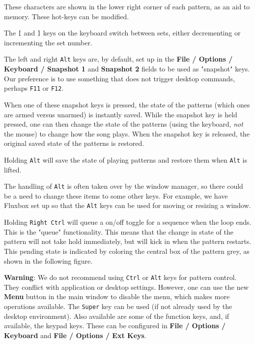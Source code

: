    These characters are shown in the lower right corner of each
   pattern, as an aid to memory.
   These hot-keys can be modified.

   \index{keys![}
   The \texttt{[} and
   \index{keys!]}
   \texttt{]} keys on the keyboard
   switch between sets, either decrementing or incrementing the set number.

   The left and right \texttt{Alt} keys are, by default, set up in the
   \textbf{File / Options / Keyboard / Snapshot 1} and
   \textbf{Snapshot 2} fields to be used as "snapshot" keys.
   Our preference is to use something that does not trigger desktop
   commands, perhaps \texttt{F11} or \texttt{F12}.

   When one of these snapshot keys is pressed, the state of the patterns
   (which ones are armed versus unarmed) is instantly saved.  While the
   snapshot key is held pressed, one can then change the state of the patterns
   (using the keyboard, \textsl{not} the mouse)
   to change how the song plays.  When the snapshot key is released, the
   original saved state of the patterns is restored.

   Holding \texttt{Alt} will save the state of playing patterns and restore
   them when \texttt{Alt} is lifted.

   The handling of \texttt{Alt} is often taken over by the window
   manager, so there could be a need to change these items to some other
   keys.  For example, we have Fluxbox set up so that the \texttt{Alt} keys can
   be used for moving or resizing a window.


   Holding \texttt{Right Ctrl}
   will queue a on/off toggle for a 
   sequence when the loop ends. This is the "queue" functionality.
   This means that the change in state of the pattern will not take hold
   immediately, but will kick in when the pattern restarts.
   This pending state is indicated by coloring the central box of the
   pattern grey, as shown in the following figure.

   \textbf{Warning}:  We do not recommend using \texttt{Ctrl} or \texttt{Alt}
   keys for pattern control.  They conflict with application or desktop
   settings.  However, one can use the new \textbf{Menu} button in the main
   window to disable the menu, which makes more operations available.
   The \texttt{Super} key can be used (if not already used by the desktop
   environment).  Also available are some of the function keys, and, if
   available, the keypad keys.  These can be configured in
   \textbf{File / Options / Keyboard} and
   \textbf{File / Options / Ext Keys}.

